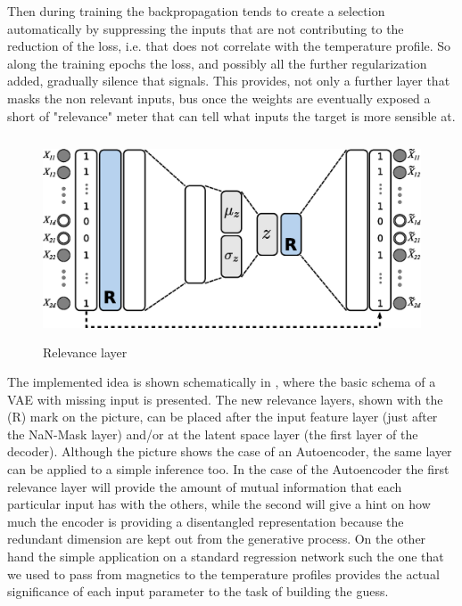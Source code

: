 Then during training the backpropagation tends to create a selection automatically by suppressing the inputs that are not contributing to the reduction of the loss, i.e. that does not correlate with the temperature profile.
So along the training epochs the loss, and possibly all the further regularization added, gradually silence that signals. This provides, not only a further layer that masks the non relevant inputs, bus once the weights are eventually exposed a short of "relevance" meter that can tell what inputs the target is more sensible at.
%
\begin{figure}
    \centering
    \includegraphics[height=6cm]{img/STEP12_7/VAE_RELEVANCE.eps}
    \caption{Relevance layer}
    \label{fig:relevance}
\end{figure}
%
The implemented idea is shown schematically in \Figure{\ref{fig:relevance}}, where the basic schema of a VAE with missing input is presented. The new relevance layers, shown with the (R) mark on the picture, can be placed after the input feature layer (just after the NaN-Mask layer) and/or at the latent space layer (the first layer of the decoder).
Although the picture shows the case of an Autoencoder, the same layer can be applied to a simple inference too.
In the case of the Autoencoder the first relevance layer will provide the amount of mutual information that each particular input has with the others, while the second will give a hint on how much the encoder is providing a disentangled representation because the redundant dimension are kept out from the generative process.
On the other hand the simple application on a standard regression network such the one that we used to pass from magnetics to the temperature profiles provides the actual significance of each input parameter to the task of building the guess.

